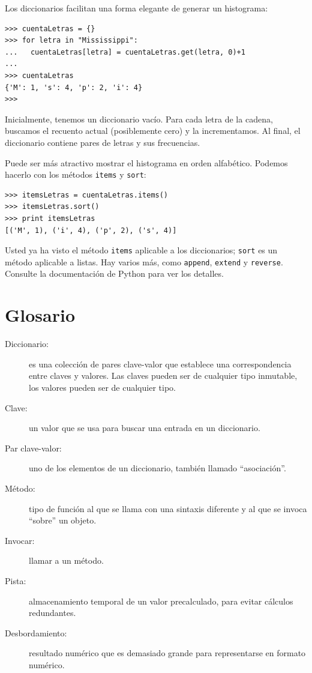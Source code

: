 Los diccionarios facilitan una forma elegante de generar un histograma:

\beforeverb
\begin{verbatim}
>>> cuentaLetras = {}
>>> for letra in "Mississippi":
...   cuentaLetras[letra] = cuentaLetras.get(letra, 0)+1
...
>>> cuentaLetras
{'M': 1, 's': 4, 'p': 2, 'i': 4}
>>>
\end{verbatim}
\afterverb
%
Inicialmente, tenemos un diccionario vacío. Para cada letra de la cadena, buscamos el recuento actual (posiblemente cero) y la incrementamos. Al final, el diccionario contiene pares de letras y sus frecuencias.

Puede ser más atractivo mostrar el histograma en orden alfabético. Podemos hacerlo con los métodos \texttt{items} y \texttt{sort}:

\beforeverb
\begin{verbatim}
>>> itemsLetras = cuentaLetras.items()
>>> itemsLetras.sort()
>>> print itemsLetras
[('M', 1), ('i', 4), ('p', 2), ('s', 4)]
\end{verbatim}
\afterverb
%
Usted ya ha visto el método \texttt{items} aplicable a los diccionarios;  \texttt{sort} 
es un método aplicable a listas. Hay varios más, como \texttt{append}, \texttt{extend} 
y \texttt{reverse}. Consulte la documentación de Python para ver los detalles.



\section{Glosario}

\begin{description}

\item[Diccionario:] es una colección de pares clave-valor que establece una correspondencia 
entre claves y valores. Las claves pueden ser de cualquier tipo inmutable, los valores 
pueden ser de cualquier tipo.

\item[Clave:] un valor que se usa para buscar una entrada en un diccionario.

\item[Par clave-valor:] uno de los elementos de un diccionario, también llamado ``asociación''.

\item[Método:] tipo de función al que se llama con una sintaxis diferente y al que se invoca 
``sobre'' un objeto.

\item[Invocar:] llamar a un método.

\item[Pista:] almacenamiento temporal de un valor precalculado, para evitar cálculos
redundantes.

\item[Desbordamiento:] resultado numérico que es demasiado grande para representarse 
en formato numérico.


\end{description}

